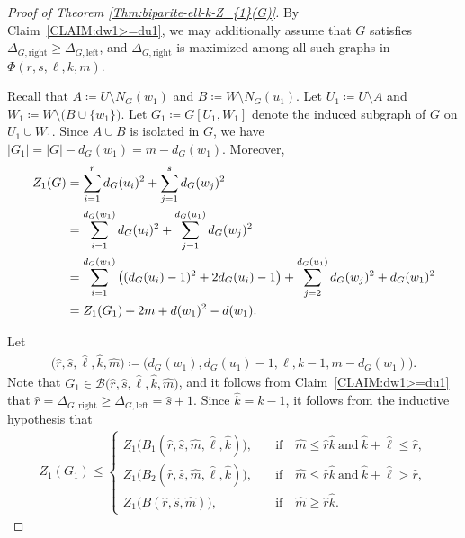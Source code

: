 \documentclass[11pt,a4paper]{article}
\begin{document}
\begin{proof}[Proof of Theorem \ref{Thm:biparite-ell-k-Z_{1}(G)}]
    By Claim~\ref{CLAIM:dw1>=du1}, we may additionally assume that $G$ satisfies $\Delta_{G, \mathrm{right}} \ge \Delta_{G, \mathrm{left}}$, and $\Delta_{G, \mathrm{right}}$ is maximized among all such graphs in $\Phi(r,s,\ell,k,m)$. 

    Recall that $A \coloneq U \setminus N_{G}(w_1)$ and $B \coloneq W \setminus N_{G}(u_1)$. 
    Let $U_1 \coloneqq U \setminus A$ and $W_1 \coloneqq W \setminus \big(B \cup \{w_1\}\big)$. 
    Let $G_1 \coloneqq G[U_1, W_1]$ denote the induced subgraph of $G$ on $U_1 \cup W_1$. 
    Since $A \cup B$ is isolated in $G$, we have $|G_1| = |G| - d_{G}(w_1) = m - d_{G}(w_1)$. 
    Moreover, 
    \begin{align}\label{equ:ZG-and-ZG1}
        Z_{1}(G) 
        & = \sum_{i=1}^{r}d_{G}(u_i)^2 + \sum_{j=1}^{s} d_{G}(w_j)^2 \notag \\ 
        & =\sum_{i=1}^{d_{G}(w_1)}d_{G}(u_i)^2 + \sum_{j=1}^{d_{G}(u_1)} d_{G}(w_j)^2 \notag \\
        & =\sum_{i=1}^{d_{G}(w_1)} \big( (d_{G}(u_i)-1)^2  + 2d_{G}(u_i) - 1 \big)  + \sum_{j=2}^{d_{G}(u_1)} d_{G}(w_j)^2 +  d_{G}(w_1)^2 \notag \\
        &= Z_{1}(G_1)+  2m  +d(w_1)^2 - d(w_1).
    \end{align}
    
    Let 
    \begin{align*}
        \big(\hat{r}, \hat{s}, \hat{\ell}, \hat{k}, \hat{m}\big)
        \coloneqq \big(d_{G}(w_1), d_{G}(u_1) - 1, \ell, k-1, m-d_{G}(w_1)  \big). 
    \end{align*}
    Note that $G_1 \in \mathcal{B}\big(\hat{r}, \hat{s}, \hat{\ell}, \hat{k}, \hat{m}\big)$, and it follows from Claim~\ref{CLAIM:dw1>=du1} that $\hat{r} = \Delta_{G, \mathrm{right}} \ge \Delta_{G, \mathrm{left}} = \hat{s} + 1$. 
    Since $\hat{k} = k-1$, it follows from the inductive hypothesis that
    \begin{align}\label{equ:induction-ZG1}
        Z_{1}(G_1) \le 
        \begin{cases}
            Z_{1}\big( B_1(\hat{r}, \hat{s}, \hat{m}, \hat{\ell}, \hat{k}) \big), &\quad\text{if}\quad \hat{m} \le \hat{r} \hat{k} ~\text{and}~ \hat{k} + \hat{\ell} \le \hat{r}, \\[0.5em]
            Z_{1}\big( B_2(\hat{r}, \hat{s}, \hat{m}, \hat{\ell}, \hat{k}) \big), &\quad\text{if}\quad \hat{m} \le \hat{r} \hat{k} ~\text{and}~ \hat{k} + \hat{\ell} > \hat{r}, \\[0.5em]
            Z_{1}\big( B(\hat{r}, \hat{s}, \hat{m}) \big), &\quad\text{if}\quad \hat{m} \ge \hat{r} \hat{k}. 
        \end{cases}
    \end{align}


\end{proof}
\end{document}
